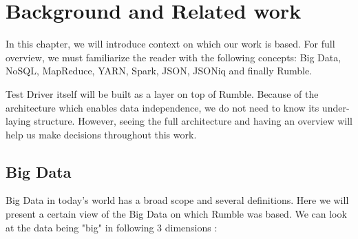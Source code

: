 \chapter{Background and Related work}
In this chapter, we will introduce context on which our work is based. For full overview, we must familiarize the reader with the following concepts: Big Data, NoSQL, MapReduce, YARN, Spark, JSON, JSONiq and finally Rumble.

Test Driver itself will be built as a layer on top of Rumble. Because of the architecture which enables data independence, we do not need to know its under-laying structure. However, seeing the full architecture and having an overview will help us make decisions throughout this work.

\section{Big Data}
Big Data in today's world has a broad scope and several definitions. Here we will present a certain view of the Big Data on which Rumble was based. We can look at the data being "big" in following 3 dimensions \cite{BigDataCourse}: 
